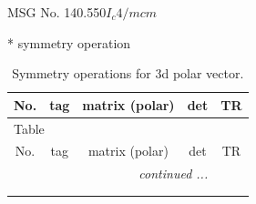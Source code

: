 \documentclass[fleqn,8pt]{jsarticle}
\begin{document}
\setcounter{MaxMatrixCols}{32}

\renewcommand{\tablename}{Table~}
\renewcommand{\figurename}{Figure~}
\begin{center}
\LARGE
MSG No. 140.550\quad$I_{c}4/mcm$
\end{center}
* symmetry operation
\renewcommand{\arraystretch}{1.3}
\begin{longtable}{ccccc}
\caption{Symmetry operations for 3d polar vector.}
 \\
 \hline \hline
No. & tag & matrix (polar) & det & TR \\ \hline \endfirsthead

\multicolumn{4}{l}{\tablename\ \thetable{}} \\
 \hline \hline
No. & tag & matrix (polar) & det & TR \\ \hline \endhead

 \hline \hline
\multicolumn{4}{r}{\footnotesize\it continued ...} \\ \endfoot

 \hline \hline
\multicolumn{4}{r}{} \\ \endlastfoot


\end{longtable}
\end{document}
